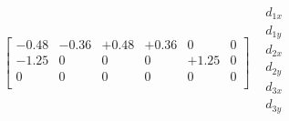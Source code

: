 \documentclass{article}
\begin{document}
\begin{math}
\begin{matrix}
\begin{bmatrix}
            -0.48&-0.36&+0.48&+0.36&0    &0\\
            -1.25&0    &0    &0    &+1.25&0\\
            0    &0    &0    &0    &0    &0\\
            \end{bmatrix}&
            \begin{matrix}
            d_{1x}\\
            d_{1y}\\
            d_{2x}\\
            d_{2y}\\
            d_{3x}\\
            d_{3y}\\
            \end{matrix}
        \end{matrix}
    \end{math}
\end{document}
